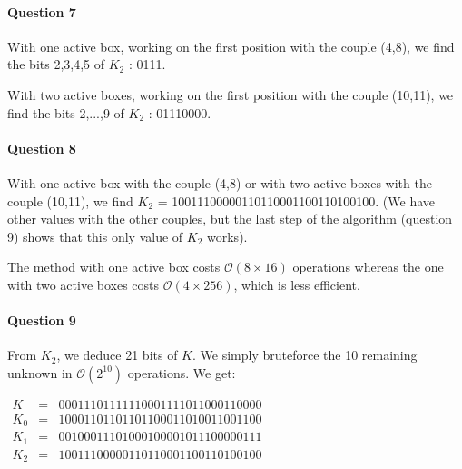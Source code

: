 \documentclass[a4paper]{article}
\begin{document}
\paragraph{Question 7}
With one active box, working on the first position with the couple (4,8), we find the bits 2,3,4,5 of $K_2$ : 0111.

With two active boxes, working on the first position with the couple (10,11), we find the bits 2,...,9 of $K_2$ : 01110000.

\paragraph{Question 8}
With one active box with the couple (4,8) or with two active boxes with the couple
(10,11), we find $K_2$ = 10011100000110110001100110100100.
(We have other values with the other couples, but the last step of the algorithm (question
9) shows that this only value of $K_2$ works).

The method with one active box costs $\mathcal{O}(8 \times 16)$ operations whereas the one with two active boxes costs $\mathcal{O}(4 \times 256)$, which is less efficient.

\paragraph{Question 9}

From $K_2$, we deduce 21 bits of $K$. We simply bruteforce the 10 remaining unknown in $\mathcal{O}(2^{10})$ operations. We get:

$
\begin{array}{rcl}
  K   & = & 00011101111110001111011000110000 \\
  K_0 & = & 10001101101101100011010011001100 \\
  K_1 & = & 00100011101000100001011100000111 \\
  K_2 & = & 10011100000110110001100110100100
\end{array}
$


 
\end{document}
